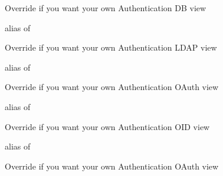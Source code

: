 \documentclass[letterpaper,10pt,english]{sphinxmanual}
\begin{document}
\begin{fulllineitems}
\begin{fulllineitems}
\end{fulllineitems}


\begin{fulllineitems}
\label{api:flask.ext.appbuilder.security.manager.BaseSecurityManager.authdbview}
Override if you want your own Authentication DB view

alias of 

\end{fulllineitems}


\begin{fulllineitems}
\label{api:flask.ext.appbuilder.security.manager.BaseSecurityManager.authldapview}
Override if you want your own Authentication LDAP view

alias of 

\end{fulllineitems}


\begin{fulllineitems}
\label{api:flask.ext.appbuilder.security.manager.BaseSecurityManager.authoauthview}
Override if you want your own Authentication OAuth view

alias of 

\end{fulllineitems}


\begin{fulllineitems}
\label{api:flask.ext.appbuilder.security.manager.BaseSecurityManager.authoidview}
Override if you want your own Authentication OID view

alias of 

\end{fulllineitems}


\begin{fulllineitems}
\label{api:flask.ext.appbuilder.security.manager.BaseSecurityManager.authremoteuserview}
Override if you want your own Authentication OAuth view


\end{fulllineitems}
\end{fulllineitems}
\end{document}
